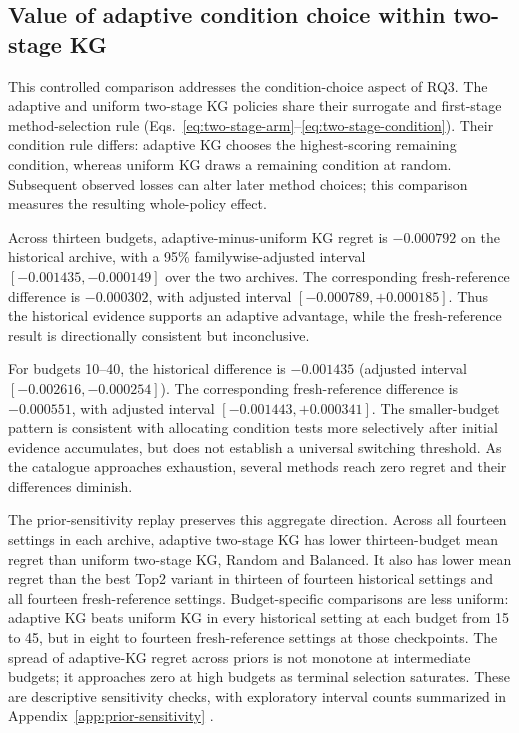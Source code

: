 \documentclass[10pt,a4paper]{article}
\begin{document}
\subsection{Value of adaptive condition choice within two-stage KG}
\label{sec:adaptive-condition-choice}
This controlled comparison addresses the condition-choice aspect of RQ3. The adaptive and uniform two-stage KG policies share their surrogate and first-stage method-selection rule (Eqs.~\eqref{eq:two-stage-arm}--\eqref{eq:two-stage-condition}). Their condition rule differs: adaptive KG chooses the highest-scoring remaining condition, whereas uniform KG draws a remaining condition at random. Subsequent observed losses can alter later method choices; this comparison measures the resulting whole-policy effect.

Across thirteen budgets, adaptive-minus-uniform KG regret is $-0.000792$ on the historical archive, with a 95\% familywise-adjusted interval $[-0.001435,-0.000149]$ over the two archives. The corresponding fresh-reference difference is $-0.000302$, with adjusted interval $[-0.000789,+0.000185]$. Thus the historical evidence supports an adaptive advantage, while the fresh-reference result is directionally consistent but inconclusive.

For budgets 10--40, the historical difference is $-0.001435$ (adjusted interval $[-0.002616,-0.000254]$). The corresponding fresh-reference difference is $-0.000551$, with adjusted interval $[-0.001443,+0.000341]$. The smaller-budget pattern is consistent with allocating condition tests more selectively after initial evidence accumulates, but does not establish a universal switching threshold. As the catalogue approaches exhaustion, several methods reach zero regret and their differences diminish.

The prior-sensitivity replay preserves this aggregate direction. Across all fourteen settings in each archive, adaptive two-stage KG has lower thirteen-budget mean regret than uniform two-stage KG, Random and Balanced. It also has lower mean regret than the best Top2 variant in thirteen of fourteen historical settings and all fourteen fresh-reference settings. Budget-specific comparisons are less uniform: adaptive KG beats uniform KG in every historical setting at each budget from 15 to 45, but in eight to fourteen fresh-reference settings at those checkpoints. The spread of adaptive-KG regret across priors is not monotone at intermediate budgets; it approaches zero at high budgets as terminal selection saturates. These are descriptive sensitivity checks, with exploratory interval counts summarized in Appendix~\ref{app:prior-sensitivity} \cite{praisePriorSensitivity}.
\end{document}
